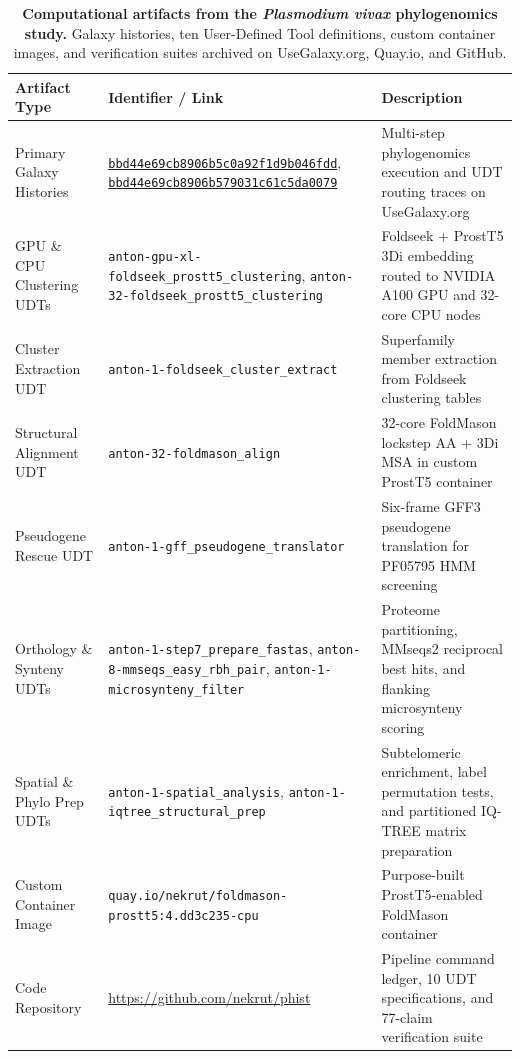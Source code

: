 \documentclass[11pt,letterpaper]{article}
\begin{document}
\begin{table}[!htbp]
\centering
\footnotesize
\begin{tabularx}{\textwidth}{p{}p{}X}
\toprule
\textbf{Artifact Type} & \textbf{Identifier / Link} & \textbf{Description} \\
\midrule
Primary Galaxy Histories & \href{https://usegalaxy.org/histories/view?id=bbd44e69cb8906b5c0a92f1d9b046fdd}{\texttt{bbd44e69cb8906b5c0a92f1d9b046fdd}}, \href{https://usegalaxy.org/histories/view?id=bbd44e69cb8906b579031c61c5da0079}{\texttt{bbd44e69cb8906b579031c61c5da0079}} & Multi-step phylogenomics execution and UDT routing traces on UseGalaxy.org \\
GPU \& CPU Clustering UDTs & \nolinkurl{anton-gpu-xl-foldseek_prostt5_clustering}, \nolinkurl{anton-32-foldseek_prostt5_clustering} & Foldseek + ProstT5 3Di embedding routed to NVIDIA A100 GPU and 32-core CPU nodes \\
Cluster Extraction UDT & \nolinkurl{anton-1-foldseek_cluster_extract} & Superfamily member extraction from Foldseek clustering tables \\
Structural Alignment UDT & \nolinkurl{anton-32-foldmason_align} & 32-core FoldMason lockstep AA + 3Di MSA in custom ProstT5 container \\
Pseudogene Rescue UDT & \nolinkurl{anton-1-gff_pseudogene_translator} & Six-frame GFF3 pseudogene translation for PF05795 HMM screening \\
Orthology \& Synteny UDTs & \nolinkurl{anton-1-step7_prepare_fastas}, \nolinkurl{anton-8-mmseqs_easy_rbh_pair}, \nolinkurl{anton-1-microsynteny_filter} & Proteome partitioning, MMseqs2 reciprocal best hits, and flanking microsynteny scoring \\
Spatial \& Phylo Prep UDTs & \nolinkurl{anton-1-spatial_analysis}, \nolinkurl{anton-1-iqtree_structural_prep} & Subtelomeric enrichment, label permutation tests, and partitioned IQ-TREE matrix preparation \\
Custom Container Image & \nolinkurl{quay.io/nekrut/foldmason-prostt5:4.dd3c235-cpu} & Purpose-built ProstT5-enabled FoldMason container \\
Code Repository & \url{https://github.com/nekrut/phist} & Pipeline command ledger, 10 UDT specifications, and 77-claim verification suite \\
\bottomrule
\end{tabularx}
\caption{\textbf{Computational artifacts from the \textit{Plasmodium vivax} phylogenomics study.} Galaxy histories, ten User-Defined Tool definitions, custom container images, and verification suites archived on UseGalaxy.org, Quay.io, and GitHub.}
\label{tab:case2_artifacts}
\end{table}
\end{document}
